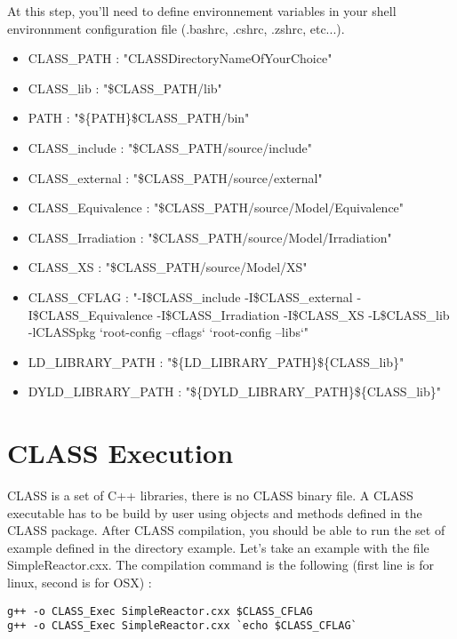 At this step, you'll need to define environnement variables in your shell environnment configuration file (.bashrc, .cshrc, .zshrc, etc...). 

\begin{itemize}
\item CLASS\_PATH : "CLASSDirectoryNameOfYourChoice"

\item CLASS\_lib : "\$CLASS\_PATH/lib"
\item PATH : "\$\{PATH\}\:\$CLASS\_PATH/bin"

\item CLASS\_include : "\$CLASS\_PATH/source/include"
\item CLASS\_external : "\$CLASS\_PATH/source/external"
\item CLASS\_Equivalence : "\$CLASS\_PATH/source/Model/Equivalence"
\item CLASS\_Irradiation : "\$CLASS\_PATH/source/Model/Irradiation"
\item CLASS\_XS : "\$CLASS\_PATH/source/Model/XS"

\item CLASS\_CFLAG : "-I\$CLASS\_include -I\$CLASS\_external -I\$CLASS\_Equivalence -I\$CLASS\_Irradiation -I\$CLASS\_XS -L\$CLASS\_lib -lCLASSpkg `root-config --cflags` `root-config --libs`"

\item LD\_LIBRARY\_PATH : "\$\{LD\_LIBRARY\_PATH\}\:\$\{CLASS\_lib\}"
\item DYLD\_LIBRARY\_PATH : "\$\{DYLD\_LIBRARY\_PATH\}\:\$\{CLASS\_lib\}"
\end{itemize}

\chapter{CLASS Execution}
CLASS is a set of C++ libraries, there is no CLASS binary file. A CLASS executable has to be build by user using objects and methods defined in the CLASS package. After CLASS compilation, you should be able to run the set of example defined in the directory example. Let's take an example with the file SimpleReactor.cxx. The compilation command is the following (first line is for linux, second is for OSX) : 

\begin{center}
\begin{minipage}{\textwidth}
\begin{lstlisting}[style=terminal]
g++ -o CLASS_Exec SimpleReactor.cxx $CLASS_CFLAG
g++ -o CLASS_Exec SimpleReactor.cxx `echo $CLASS_CFLAG`
\end{lstlisting}
\end{minipage}
\end{center}


